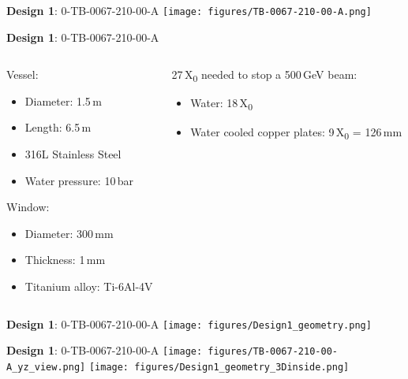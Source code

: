 \documentclass[xcolor={dvipsnames}]{beamer}
\begin{document}
\begin{frame}{\textbf{Design 1}: 0-TB-0067-210-00-A}
\centering
 \texttt{[image: figures/TB-0067-210-00-A.png]}
\end{frame}
{
\begin{frame}{\textbf{Design 1}: 0-TB-0067-210-00-A}
\begin{columns}
 \begin{column}{0.5\textwidth}
  Vessel:
  \begin{itemize}
   \item Diameter: 1.5\,m
   \item Length: 6.5\,m
   \item 316L Stainless Steel
   \item Water pressure: 10\,bar
  \end{itemize}
  Window:
  \begin{itemize}
   \item Diameter: 300\,mm
   \item Thickness: 1\,mm
   \item Titanium alloy: Ti-6Al-4V 
  \end{itemize}
 \end{column}
 \begin{column}{0.5\textwidth}
  27\,X\textsubscript{0} needed to stop a 500\,GeV beam:
  \begin{itemize}
   \item Water: 18\,X\textsubscript{0}
   \item Water cooled copper plates: 9\,X\textsubscript{0} = 126\,mm
  \end{itemize}  
 \end{column}
\end{columns}

\end{frame}
}
\begin{frame}{\textbf{Design 1}: 0-TB-0067-210-00-A}
\centering
 \texttt{[image: figures/Design1\_geometry.png]}
\end{frame}
\begin{frame}{\textbf{Design 1}: 0-TB-0067-210-00-A}
\centering
 \texttt{[image: figures/TB-0067-210-00-A\_yz\_view.png]}
 \hfill
 \texttt{[image: figures/Design1\_geometry\_3Dinside.png]}
\end{frame}
\end{document}

